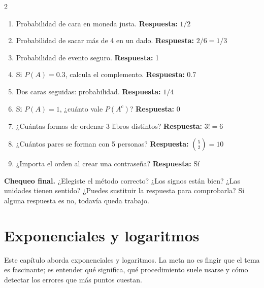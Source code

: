 \documentclass[10pt,oneside,openany]{book}
\begin{document}
\begin{multicols}{2}\begin{enumerate}

\item Probabilidad de cara en moneda justa. \textbf{Respuesta:} $1/2$

\item Probabilidad de sacar más de 4 en un dado. \textbf{Respuesta:} $2/6=1/3$

\item Probabilidad de evento seguro. \textbf{Respuesta:} 1

\item Si $P(A)=0.3$, calcula el complemento. \textbf{Respuesta:} 0.7

\item Dos caras seguidas: probabilidad. \textbf{Respuesta:} $1/4$

\item Si $P(A)=1$, ¿cuánto vale $P(A^c)$? \textbf{Respuesta:} 0

\item ¿Cuántas formas de ordenar 3 libros distintos? \textbf{Respuesta:} $3!=6$

\item ¿Cuántos pares se forman con 5 personas? \textbf{Respuesta:} $\binom52=10$

\item ¿Importa el orden al crear una contraseña? \textbf{Respuesta:} Sí

\end{enumerate}\end{multicols}

\begin{idea}\textbf{Chequeo final.} ¿Elegiste el método correcto? ¿Los signos están bien? ¿Las unidades tienen sentido? ¿Puedes sustituir la respuesta para comprobarla? Si alguna respuesta es no, todavía queda trabajo.\end{idea}



\chapter{Exponenciales y logaritmos}

\begin{idea}
Este capítulo aborda exponenciales y logaritmos. La meta no es fingir que el tema es fascinante; es entender qué significa, qué procedimiento suele usarse y cómo detectar los errores que más puntos cuestan.
\end{idea}
\end{document}
